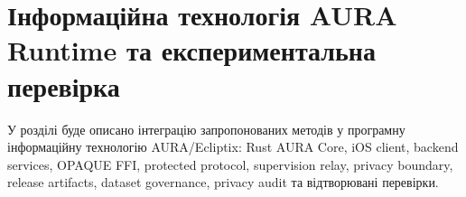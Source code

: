 \chapter{Інформаційна технологія AURA Runtime та експериментальна перевірка}

У розділі буде описано інтеграцію запропонованих методів у програмну інформаційну технологію AURA/Ecliptix: Rust AURA Core, iOS client, backend services, OPAQUE FFI, protected protocol, supervision relay, privacy boundary, release artifacts, dataset governance, privacy audit та відтворювані перевірки.
